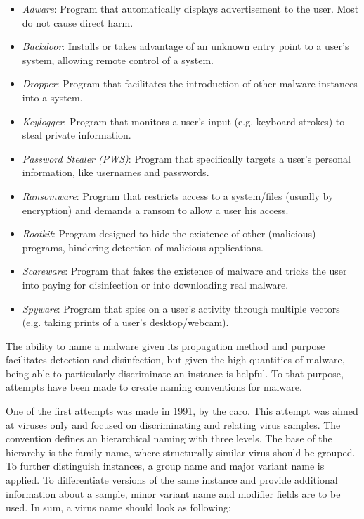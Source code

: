\documentclass{llncs}
\begin{document}
\begin{itemize}
	\item \textit{Adware}: Program that automatically displays advertisement to the user. Most do not cause direct harm.
	\item \textit{Backdoor}: Installs or takes advantage of an unknown entry point to a user's system, allowing remote control of a system.
	\item \textit{Dropper}: Program that facilitates the introduction of other malware instances into a system.
	\item \textit{Keylogger}: Program that monitors a user's input (e.g. keyboard strokes) to steal private information.
	\item \textit{Password Stealer (PWS)}: Program that specifically targets a user's personal information, like usernames and passwords.
	\item \textit{Ransomware}: Program that restricts access to a system/files (usually by encryption) and demands a ransom to allow a user his access.
	\item \textit{Rootkit}: Program designed to hide the existence of other (malicious) programs, hindering detection of malicious applications.
	\item \textit{Scareware}: Program that fakes the existence of malware and tricks the user into paying for disinfection or into downloading real malware.
	\item \textit{Spyware}: Program that spies on a user's activity through multiple vectors (e.g. taking prints of a user's desktop/webcam).
\end{itemize}

The ability to name a malware given its propagation method and purpose facilitates detection and disinfection, but given the high quantities of malware, being able to particularly discriminate an instance is helpful. To that purpose, attempts have been made to create naming conventions for malware.

One of the first attempts was made in 1991, by the \gls{caro}\cite{caro:naming}. This attempt was aimed at viruses only and focused on discriminating and relating virus samples. The convention defines an hierarchical naming with three levels. The base of the hierarchy is the family name, where structurally similar virus should be grouped. To further distinguish instances, a group name and major variant name is applied. To differentiate versions of the same instance and provide additional information about a sample, minor variant name and modifier fields are to be used. In sum, a virus name should look as following:
\end{document}
